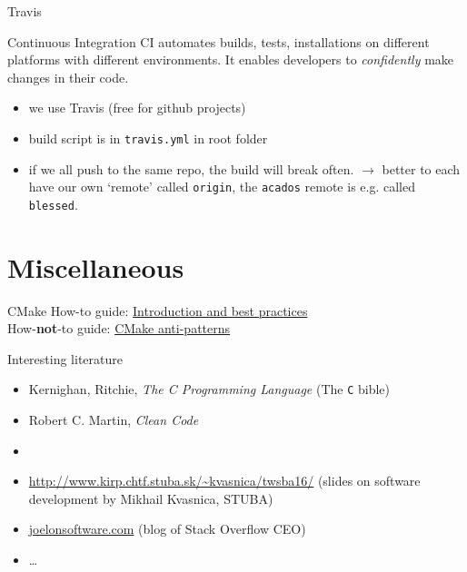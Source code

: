 \documentclass[10pt]{beamer}
\begin{document}
\begin{frame}{Travis}
    \begin{beamerboxesrounded}{Continuous Integration}
        CI automates builds, tests, installations on different platforms with different environments. It enables developers to \emph{confidently} make changes in their code.
    \end{beamerboxesrounded}
    \begin{itemize}
        \item we use Travis (free for github projects)
        \item build script is in \texttt{travis.yml} in root folder
        \item if we all push to the same repo, the build will break often. \newline $\rightarrow$ better to each have our own `remote' called \texttt{origin}, the \texttt{acados} remote is e.g. called \texttt{blessed}.
    \end{itemize}
\end{frame}

\section{Miscellaneous}

\begin{frame}{CMake}
    How-to guide: \hyperlink{http://www.slideshare.net/DanielPfeifer1/cmake-48475415}{Introduction and best practices} \\ \vspace{1cm}
    How-\textbf{not}-to guide: \hyperlink{http://voices.canonical.com/jussi.pakkanen/2013/03/26/a-list-of-common-cmake-antipatterns/}{CMake anti-patterns}
\end{frame}

\begin{frame}{Interesting literature}
    \begin{itemize}
        \item Kernighan, Ritchie, \emph{The C Programming Language}    (The \texttt{C} bible)
        \item Robert C. Martin, \emph{Clean Code}
        \item
        \item \url{http://www.kirp.chtf.stuba.sk/~kvasnica/twsba16/} (slides on software development by Mikhail Kvasnica, STUBA)
        \item \url{joelonsoftware.com} (blog of Stack Overflow CEO)
        \item \ldots
    \end{itemize}
\end{frame}


\end{document}

